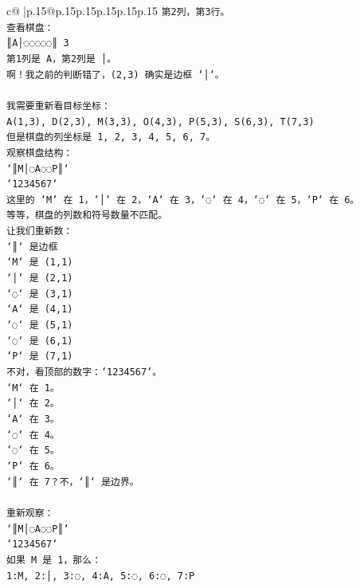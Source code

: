 \documentclass{article}
\begin{document}
{\begin{supertabular}{c@{$\;$}|p{.15\linewidth}@{}p{.15\linewidth}p{.15\linewidth}p{.15\linewidth}p{.15\linewidth}p{.15\linewidth}}
{{{\texttt{第2列，第3行。} \\
\texttt{查看棋盘：} \\
\texttt{║A│◌◌◌◌◌║ 3} \\
\texttt{第1列是 A，第2列是 │。} \\
\texttt{啊！我之前的判断错了，(2,3) 确实是边框 `│`。} \\
\\ 
\texttt{我需要重新看目标坐标：} \\
\texttt{A(1,3), D(2,3), M(3,3), O(4,3), P(5,3), S(6,3), T(7,3)} \\
\texttt{但是棋盘的列坐标是 1, 2, 3, 4, 5, 6, 7。} \\
\texttt{观察棋盘结构：} \\
\texttt{`║M│◌A◌◌P║`} \\
\texttt{`1234567`} \\
\texttt{这里的 `M` 在 1，`│` 在 2，`A` 在 3，`◌` 在 4，`◌` 在 5，`P` 在 6。} \\
\texttt{等等，棋盘的列数和符号数量不匹配。} \\
\texttt{让我们重新数：} \\
\texttt{`║` 是边框} \\
\texttt{`M` 是 (1,1)} \\
\texttt{`│` 是 (2,1)} \\
\texttt{`◌` 是 (3,1)} \\
\texttt{`A` 是 (4,1)} \\
\texttt{`◌` 是 (5,1)} \\
\texttt{`◌` 是 (6,1)} \\
\texttt{`P` 是 (7,1)} \\
\texttt{不对，看顶部的数字：`1234567`。} \\
\texttt{`M` 在 1。} \\
\texttt{`│` 在 2。} \\
\texttt{`A` 在 3。} \\
\texttt{`◌` 在 4。} \\
\texttt{`◌` 在 5。} \\
\texttt{`P` 在 6。} \\
\texttt{`║` 在 7？不，`║` 是边界。} \\
\\ 
\texttt{重新观察：} \\
\texttt{`║M│◌A◌◌P║`} \\
\texttt{`1234567`} \\
\texttt{如果 M 是 1，那么：} \\
\texttt{1:M, 2:│, 3:◌, 4:A, 5:◌, 6:◌, 7:P} \\
}}}
\end{supertabular}}
\end{document}
